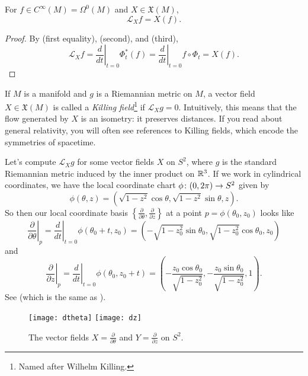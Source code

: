 \begin{lemma}\label{lem:Lie derivative of function}
	For $f \in C^\infty(M) = \Omega^0(M)$ and $X \in \mathfrak{X}(M)$, 
	\[
		\mathcal{L}_Xf = X(f).
	\]
\end{lemma}

\begin{proof}
	By  (first equality),  (second), and  (third), 
	\[
		\mathcal{L}_Xf = \left. \frac{d}{dt}\right|_{t=0} \Phi_t^\ast(f) = \left. \frac{d}{dt}\right|_{t=0} f \circ \Phi_t = X(f).
	\]
\end{proof}

\begin{example}
	If $M$ is a manifold and $g$ is a Riemannian metric on $M$, a vector field $X \in \mathfrak{X}(M)$ is called a \emph{Killing field}\footnote{Named after Wilhelm Killing.} if $\mathcal{L}_Xg = 0$. Intuitively, this means that the flow generated by $X$ is an isometry: it preserves distances. If you read about general relativity, you will often see references to Killing fields, which encode the symmetries of spacetime.
	
	Let's compute $\mathcal{L}_X g$ for some vector fields $X$ on $S^2$, where $g$ is the standard Riemannian metric induced by the inner product on $\mathbb{R}^3$. If we work in cylindrical coordinates, we have the local coordinate chart $\phi\colon\thinspace\! (0,2\pi) \to S^2$ given by
	\[
		\phi(\theta, z) = \left(\sqrt{1-z^2}\cos \theta, \sqrt{1-z^2} \sin \theta, z\right).
	\]
	So then our local coordinate basis $\left\{\frac{\partial}{\partial \theta}, \frac{\partial}{\partial z} \right\}$ at a point $p = \phi(\theta_0,z_0)$ looks like
	\[
		\left. \frac{\partial}{\partial \theta}\right|_p = \left. \frac{d}{dt} \right|_{t=0} \phi(\theta_0+t,z_0) = \left(-\sqrt{1-z_0^2}\sin\theta_0, \sqrt{1-z_0^2}\cos \theta_0,z_0\right)
	\]
	and
	\[
		\left. \frac{\partial}{\partial z}\right|_p = \left. \frac{d}{dt} \right|_{t=0} \phi(\theta_0,z_0+t) = \left(-\frac{z_0 \cos \theta_0}{\sqrt{1-z_0^2}},-\frac{z_0 \sin \theta_0}{\sqrt{1-z_0^2}},1\right).
	\]
	See  (which is the same as ).
	\begin{figure}[htbp]
		\centering
			\texttt{[image: dtheta]} \qquad \texttt{[image: dz]}
		\caption{The vector fields $X = \frac{\partial}{\partial \theta}$ and $Y = \frac{\partial}{\partial z}$ on $S^2$.}
		\label{fig:dtheta and dz 2}
	\end{figure}
	

\end{example}
